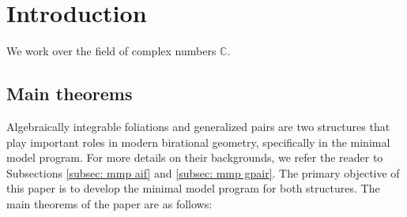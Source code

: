 \documentclass[11pt]{amsart}
\numberwithin{equation}{section}
\newcommand{\bb}{\bm{b}}
\newcommand{\Qq}{\mathbb{Q}}
\theoremstyle{definition}
\theoremstyle{definition}
\theoremstyle{definition}
\begin{document}

\address{School of Mathematical Sciences, Shanghai Jiao Tong University, 800 Dongchuan RD Shanghai, Minhang District Shanghai 200240, China}

\address{Shanghai Center for Mathematical Sciences, Fudan University, Shanghai, 200438, China}


\address{Department of Mathematics, Northwestern University, 2033 Sheridan Road, Evanston, IL 60208, USA}


\address{Department of Mathematics, The University of Utah, Salt Lake City, UT 84112, USA}

\maketitle

\pagestyle{myheadings}

\tableofcontents

\section{Introduction}\label{sec:Introduction}

We work over the field of complex numbers $\mathbb C$.

\subsection{Main theorems} Algebraically integrable foliations and generalized pairs are two structures that play important roles in modern birational geometry, specifically in the minimal model program. For more details on their backgrounds, we refer the reader to Subsections \ref{subsec: mmp aif} and \ref{subsec: mmp gpair}. The primary objective of this paper is to develop the minimal model program for both structures. The main theorems of the paper are as follows:
\end{document}
